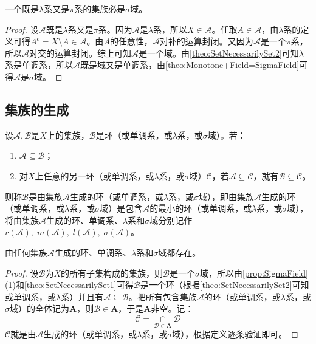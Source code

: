 \begin{theorem}\label{theo:Lambda+Pi=Sigma}
	一个既是$\lambda$系又是$\pi$系的集族必是$\sigma$域。
\end{theorem}
\begin{proof}
	设$\mathscr{A}$既是$\lambda$系又是$\pi$系。因为$\mathscr{A}$是$\lambda$系，所以$X\in\mathscr{A}$。任取$A\in\mathscr{A}$，由$\lambda$系的定义可得$A^c=X\setminus A\in\mathscr{A}$。由$A$的任意性，$\mathscr{A}$对补的运算封闭。又因为$\mathscr{A}$是一个$\pi$系，所以$\mathscr{A}$对交的运算封闭。综上可知$\mathscr{A}$是一个域。由\cref{theo:SetNecessarilySet2}可知$\lambda$系是单调系，所以$\mathscr{A}$既是域又是单调系，由\cref{theo:Monotone+Field=SigmaField}可得$\mathscr{A}$是$\sigma$域。
\end{proof}

\subsection{集族的生成}
\begin{definition}
	设$\mathscr{A},\mathscr{B}$是$X$上的集族，$\mathscr{B}$是环（或单调系，或$\lambda$系，或$\sigma$域）。若：
	\begin{enumerate}
		\item $\mathscr{A}\subseteq\mathscr{B}$；
		\item 对$X$上任意的另一环（或单调系，或$\lambda$系，或$\sigma$域）$\mathscr{C}$，若$\mathscr{A}\subseteq\mathscr{C}$，就有$\mathscr{B}\subseteq\mathscr{C}$。
	\end{enumerate}
	则称$\mathscr{B}$是由集族$\mathscr{A}$生成的环（或单调系，或$\lambda$系，或$\sigma$域），即由集族$\mathscr{A}$生成的环（或单调系，或$\lambda$系，或$\sigma$域）是包含$\mathscr{A}$的最小的环（或单调系，或$\lambda$系，或$\sigma$域），将由集族$\mathscr{A}$生成的环、单调系、$\lambda$系和$\sigma$域分别记作$r(\mathscr{A}),\;m(\mathscr{A}),\;l(\mathscr{A}),\;\sigma(\mathscr{A})$。
\end{definition}
\begin{theorem}
	由任何集族$\mathscr{A}$生成的环、单调系、$\lambda$系和$\sigma$域都存在。
\end{theorem}
\begin{proof}
	设$\mathscr{B}$为$X$的所有子集构成的集族，则$\mathscr{B}$是一个$\sigma$域，所以由\cref{prop:SigmaField}(1)和\cref{theo:SetNecessarilySet1}可得$\mathscr{B}$是一个环（根据\cref{theo:SetNecessarilySet2}可知或单调系，或$\lambda$系）并且有$\mathscr{A}\subseteq\mathscr{B}$。把所有包含集族$\mathscr{A}$的环（或单调系，或$\lambda$系，或$\sigma$域）的全体记为$\mathbf{A}$，则$\mathscr{B}\in \mathbf{A}$，于是$\mathbf{A}$非空。记：
	\begin{equation*}
		\mathscr{C}=\underset{\mathscr{D}\in \mathbf{A}}{\cap}\mathscr{D}
	\end{equation*}
	$\mathscr{C}$就是由$\mathscr{A}$生成的环（或单调系，或$\lambda$系，或$\sigma$域），根据定义逐条验证即可。
\end{proof}
